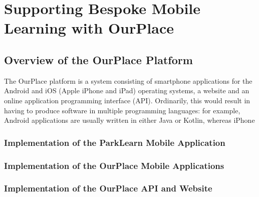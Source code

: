 \chapter{Supporting Bespoke Mobile Learning with OurPlace}



\section{Overview of the OurPlace Platform}
\label{sec:Implementation}

The OurPlace platform is a system consisting of smartphone applications for the
Android and iOS (Apple iPhone and iPad) operating systems, a website and an online application
programming interface (API). Ordinarily, this would result in having to produce
software in multiple programming languages: for example, Android applications
are usually written in either Java or Kotlin, whereas iPhone

\subsection{Implementation of the ParkLearn Mobile Application}
\label{sec:ImplementationParkLearn}

\subsection{Implementation of the OurPlace Mobile Applications}
\label{sec:ImplementationMobile}

\subsection{Implementation of the OurPlace API and Website}
\label{sec:ImplementationWeb}